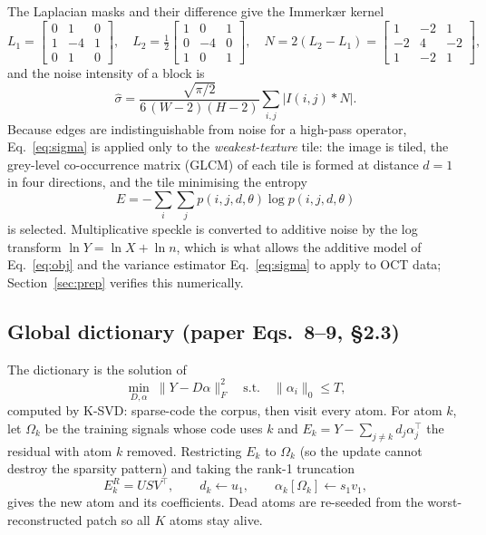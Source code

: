 \documentclass[11pt,a4paper]{article}
\newcommand{\sh}{\hat{\sigma}}
\newcommand{\norm}[1]{\lVert #1\rVert}
\begin{document}
The Laplacian masks and their difference give the Immerkær kernel
\begin{equation}
L_1=\begin{bmatrix}0&1&0\\1&-4&1\\0&1&0\end{bmatrix},\quad
L_2=\tfrac12\begin{bmatrix}1&0&1\\0&-4&0\\1&0&1\end{bmatrix},\quad
N=2(L_2-L_1)=\begin{bmatrix}1&-2&1\\-2&4&-2\\1&-2&1\end{bmatrix},
\label{eq:kernel}
\end{equation}
and the noise intensity of a block is
\begin{equation}
\sh=\frac{\sqrt{\pi/2}}{6\,(W-2)(H-2)}\sum_{i,j}\bigl|I(i,j)*N\bigr| .
\label{eq:sigma}
\end{equation}
Because edges are indistinguishable from noise for a high-pass operator, Eq.~\eqref{eq:sigma} is applied only to the
\emph{weakest-texture} tile: the image is tiled, the grey-level co-occurrence matrix (GLCM) of each tile is formed
at distance $d=1$ in four directions, and the tile minimising the entropy
\begin{equation}
E=-\sum_i\sum_j p(i,j,d,\theta)\log p(i,j,d,\theta)
\label{eq:entropy}
\end{equation}
is selected. Multiplicative speckle is converted to additive noise by the log transform
$\ln Y=\ln X+\ln n$, which is what allows the additive model of Eq.~\eqref{eq:obj} and the variance estimator
Eq.~\eqref{eq:sigma} to apply to OCT data; Section~\ref{sec:prep} verifies this numerically.

\subsection{Global dictionary (paper Eqs.\ 8--9, \S2.3)}

The dictionary is the solution of
\begin{equation}
\min_{D,\alpha}\ \norm{Y-D\alpha}_F^2\quad\text{s.t.}\quad \norm{\alpha_i}_0\le T ,
\label{eq:ksvd}
\end{equation}
computed by K-SVD: sparse-code the corpus, then visit every atom. For atom $k$, let $\Omega_k$ be the training
signals whose code uses $k$ and
$E_k=Y-\sum_{j\neq k}d_j\alpha_j^\top$ the residual with atom $k$ removed. Restricting $E_k$ to $\Omega_k$ (so the
update cannot destroy the sparsity pattern) and taking the rank-1 truncation
\begin{equation}
E_k^{R}=U S V^{\top},\qquad d_k\leftarrow u_1,\qquad \alpha_k[\Omega_k]\leftarrow s_1 v_1 ,
\label{eq:atom}
\end{equation}
gives the new atom and its coefficients. Dead atoms are re-seeded from the worst-reconstructed patch so all $K$
atoms stay alive.
\end{document}
